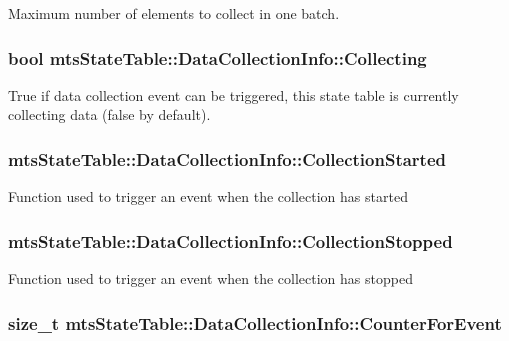 Maximum number of elements to collect in one batch. \hypertarget{classmts_state_table_1_1_data_collection_info_a3cba7424d384d2c04aef689839de610f}{
\subsubsection[{Collecting}]{\setlength{\rightskip}{0pt plus 5cm}bool mts\-State\-Table\-::\-Data\-Collection\-Info\-::\-Collecting}}\label{classmts_state_table_1_1_data_collection_info_a3cba7424d384d2c04aef689839de610f}
True if data collection event can be triggered, this state table is currently collecting data (false by default). \hypertarget{classmts_state_table_1_1_data_collection_info_a95b64dcedf855f7881f4903e74101549}{
\subsubsection[{Collection\-Started}]{ mts\-State\-Table\-::\-Data\-Collection\-Info\-::\-Collection\-Started}}\label{classmts_state_table_1_1_data_collection_info_a95b64dcedf855f7881f4903e74101549}
Function used to trigger an event when the collection has started \hypertarget{classmts_state_table_1_1_data_collection_info_ae4ff6ebaf115c070c00ff0686997383f}{
\subsubsection[{Collection\-Stopped}]{ mts\-State\-Table\-::\-Data\-Collection\-Info\-::\-Collection\-Stopped}}\label{classmts_state_table_1_1_data_collection_info_ae4ff6ebaf115c070c00ff0686997383f}
Function used to trigger an event when the collection has stopped \hypertarget{classmts_state_table_1_1_data_collection_info_aeefcc3cd75cdec6523e62fb6447b9aab}{
\subsubsection[{Counter\-For\-Event}]{\setlength{\rightskip}{0pt plus 5cm}size\-\_\-t mts\-State\-Table\-::\-Data\-Collection\-Info\-::\-Counter\-For\-Event}}\label{classmts_state_table_1_1_data_collection_info_aeefcc3cd75cdec6523e62fb6447b9aab}
